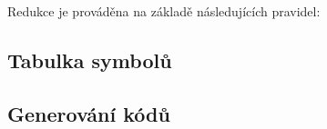 \documentclass[czech,a4paper,12pt]{article}[]
\begin{document}
\begin{inpar}
\begin{inpar}
\begin{enumerate}
            \end{enumerate}
            Redukce je prováděna na základě následujících pravidel:
            \begin{center}
            \end{center}
        \end{inpar}
    \end{inpar}

    \subsection{Tabulka symbolů}
    \subsection{Generování kódů}
\end{document}
